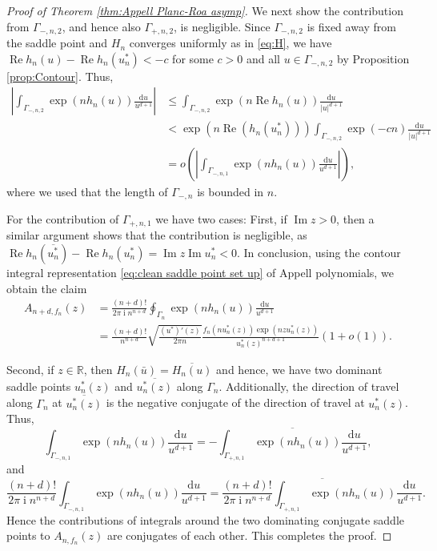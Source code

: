 \documentclass[reqno]{amsart}
\newcommand{\1}{\mathbf{1}}
\newcommand{\dd}{\mathrm{d}}
\DeclareMathOperator{\ii}{i}
\renewcommand\Re{\operatorname{Re}}
\renewcommand\Im{\operatorname{Im}}
\newcommand{\R}{\mathbb{R}}
\def\R{\mathbb{R}}
\theoremstyle{plain}
\theoremstyle{definition}
\theoremstyle{remark}
\numberwithin{equation}{section}
\begin{document}
\begin{proof}[Proof of Theorem \ref{thm:Appell Planc-Roa asymp}]
		We next show the contribution from $\Gamma_{-,n,2}$, and hence also $\Gamma_{+,n,2}$, is negligible. Since $\Gamma_{-,n,2}$ is fixed away from the saddle point and $H_{n}$ converges uniformly as in \eqref{eq:H}, we have $\Re h_{n}(u)-\Re h_{n}(u_n^*)<-c$ for some $c>0$ and all $u\in\Gamma_{-,n,2}$ by Proposition \ref{prop:Contour}. Thus, \begin{equation}
		\begin{aligned}
			\left|\int_{\Gamma_{-,n,2}}\exp(nh_{n}(u))\frac{\dd u}{u^{d+1}}\right|&\leq \int_{\Gamma_{-,n,2}}\exp(n\Re h_n(u))\frac{\dd u}{|u|^{d+1}}\\
			&<\exp({n\Re(h_n(u_n^*))})\int_{\Gamma_{-,n,2}}\exp(-c n) %
			\frac{\dd u}{|u|^{d+1}}\\
			&=o\left(\left|\int_{\Gamma_{-,n,1}}\exp(nh_{n}(u))\frac{\dd u}{u^{d+1}}\right| \right),
		\end{aligned}
		\end{equation}where we used that the length of $\Gamma_{-,n}$ is bounded in $n$.
		
		 For the contribution of $\Gamma_{+,n,1}$ we have two cases: First, if $\Im z>0$, then a similar argument shows that the contribution is negligible, as $\Re h_{n}(\overline{u_n^*})-\Re h_{n}(u_n^*)=\Im z\Im u_n^*<0$. In conclusion, using the contour integral representation \eqref{eq:clean saddle point set up} of Appell polynomials, we obtain the claim
		\begin{align*}
				A_{n+d,f_n}(z) &=\frac{(n+d)!}{2\pi\ii n^{n+d}}\oint_{\Gamma_n}\exp\left(nh_n(u)\right)\frac{\dd u}{u^{d+1}}\\
				&=\frac{(n+d)!}{n^{n+d}}\sqrt{\frac{(u^*)'(z) }{2\pi n}}\frac{f_{n}\left(nu_n^*(z) \right)\exp\left(nzu_n^*(z) \right)}{u_n^*(z)^{n+d+1}}(1+o(1)).
		\end{align*}
	
		Second, if $z\in\R$, then $H_n(\bar u)=\overline{H_n(u)}$ and hence, we have two dominant saddle points $u_n^*(z)$ and $\overline{u_n^*(z)}$ along $\Gamma_n$. Additionally, the direction of travel along $\Gamma_n$ at $\overline{u_n^*(z)}$ is the negative conjugate of the direction of travel at $u_n^*(z)$. Thus, \begin{equation}
			\int_{\Gamma_{-,n,1}}\exp(nh_{n}(u))\frac{\dd u}{u^{d+1}}=-\overline{\int_{\Gamma_{+,n,1}}\exp(nh_{n}(u))\frac{\dd u}{u^{d+1}} }, 
		\end{equation} and \begin{equation}
		\frac{(n+d)!}{2\pi\ii n^{n+d}}\int_{\Gamma_{-,n,1}}\exp(nh_{n}(u))\frac{\dd u}{u^{d+1}}=	\overline{\frac{(n+d)!}{2\pi\ii n^{n+d}}\int_{\Gamma_{+,n,1}}\exp(nh_{n}(u))\frac{\dd u}{u^{d+1}} }.
		\end{equation}  
		Hence the contributions of integrals around the two  dominating conjugate saddle points to $A_{n,f_n}(z)$ are conjugates of each other. This completes the proof.
	\end{proof}
	
\end{document}
